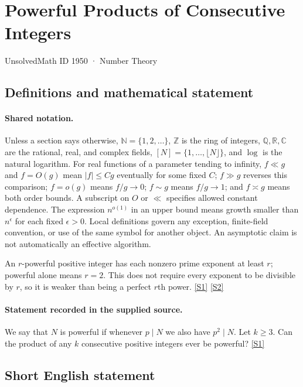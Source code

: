 \documentclass[11pt,a4paper]{article}
\newcommand{\N}{\mathbb{N}}
\newcommand{\Z}{\mathbb{Z}}
\newcommand{\Q}{\mathbb{Q}}
\newcommand{\R}{\mathbb{R}}
\newcommand{\C}{\mathbb{C}}
\newcommand{\sref}[2]{\hyperlink{source:#1:#2}{[S#2]}}
\begin{document}

\setcounter{section}{1949}

\section{Powerful Products of Consecutive Integers}\label{1950}

{\small\sffamily UnsolvedMath ID 1950 · Number Theory}

\subsection{Definitions and mathematical statement}

\paragraph{Shared notation.}Unless a section says otherwise, $\N=\{1,2,\ldots\}$,
$\Z$ is the ring of integers, $\Q,\R,\C$ are the rational, real, and complex
fields, $[N]=\{1,\ldots,\lfloor N\rfloor\}$, and $\log$ is the natural
logarithm. For real functions of a parameter tending to infinity,
$f\ll g$ and $f=O(g)$ mean $|f|\leq Cg$ eventually for some fixed $C$;
$f\gg g$ reverses this comparison; $f=o(g)$ means $f/g\to0$;
$f\sim g$ means $f/g\to1$; and $f\asymp g$ means both order bounds.
A subscript on $O$ or $\ll$ specifies allowed constant dependence.
The expression $n^{o(1)}$ in an upper bound means growth smaller than
$n^\epsilon$ for each fixed $\epsilon>0$. Local definitions govern any
exception, finite-field convention, or use of the same symbol for another
object. An asymptotic claim is not automatically an effective algorithm.



An $r$-powerful positive integer has each nonzero prime exponent at least $r$; powerful alone means $r=2$. This does not require every exponent to be divisible by $r$, so it is weaker than being a perfect $r$th power. \sref{1950}{1} \sref{1950}{2}

\paragraph{Statement recorded in the supplied source.}
We say that $N$ is powerful if whenever $p\mid N$ we also have $p^2\mid N$. Let $k\geq 3$. Can the product of any $k$ consecutive positive integers ever be powerful? \sref{1950}{1}

\subsection{Short English statement}
\end{document}
